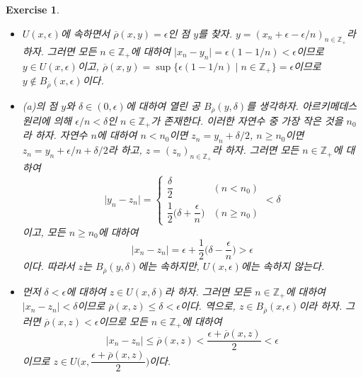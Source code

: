 \documentclass{article}
\newtheorem{exercise}{Exercise}[section]
\newcommand{\Z}{\mathbb{Z}}
\begin{document}
\begin{exercise}
	\label{exc:20.6}
    \phantom{}
    \begin{itemize}
        \item[(a)] $U(x,\epsilon)$에 속하면서 $\overline{\rho}(x,y)=\epsilon$인 점 $y$를 찾자. $y=(x_n+\epsilon-\epsilon/n)_{n\in\Z_+}$라 하자. 그러면 모든 $n\in\Z_+$에 대하여 $\vert x_n-y_n\vert=\epsilon(1-1/n)<\epsilon$이므로 $y\in U(x,\epsilon)$이고, $\overline{\rho}(x,y)=\sup\{\epsilon(1-1/n)\mid n\in\Z_+\}=\epsilon$이므로 $y\notin B_{\overline{\rho}}(x,\epsilon)$이다.
        \item[(b)] (a)의 점 $y$와 $\delta\in(0,\epsilon)$에 대하여 열린 공 $B_{\overline{\rho}}(y,\delta)$를 생각하자. 아르키메데스 원리에 의해 $\epsilon/n<\delta$인 $n\in\Z_+$가 존재한다. 이러한 자연수 중 가장 작은 것을 $n_0$라 하자. 자연수 $n$에 대하여 $n<n_0$이면 $z_n=y_n+\delta/2$, $n\geq n_0$이면 $z_n=y_n+\epsilon/n+\delta/2$라 하고, $z=(z_n)_{n\in\Z_+}$라 하자. 그러면 모든 $n\in\Z_+$에 대하여
        \[
            \vert y_n-z_n\vert=\begin{cases}
                \dfrac{\delta}{2} & (n<n_0) \\[6pt]
                \dfrac{1}{2}\biggl(\delta+\dfrac{\epsilon}{n}\biggr) & (n\geq n_0)
            \end{cases}<\delta
        \]
        이고, 모든 $n\geq n_0$에 대하여
        \[
            \vert x_n-z_n\vert=\epsilon+\frac{1}{2}\biggl(\delta-\frac{\epsilon}{n}\biggr)>\epsilon
        \]
        이다. 따라서 $z$는 $B_{\overline{\rho}}(y,\delta)$에는 속하지만, $U(x,\epsilon)$에는 속하지 않는다.
        \item[(c)] 먼저 $\delta<\epsilon$에 대하여 $z\in U(x,\delta)$라 하자. 그러면 모든 $n\in\Z_+$에 대하여 $\vert x_n-z_n\vert<\delta$이므로 $\overline{\rho}(x,z)\leq\delta<\epsilon$이다. 역으로, $z\in B_{\overline{\rho}}(x,\epsilon)$이라 하자. 그러면 $\overline{\rho}(x,z)<\epsilon$이므로 모든 $n\in\Z_+$에 대하여
        \[
            \vert x_n-z_n\vert\leq\overline{\rho}(x,z)<\dfrac{\epsilon+\overline{\rho}(x,z)}{2}<\epsilon
        \]
        이므로 $z\in U\biggl(x,\dfrac{\epsilon+\overline{\rho}(x,z)}{2}\biggr)$이다.
    \end{itemize}
\end{exercise}
\end{document}
